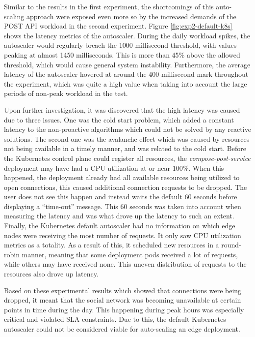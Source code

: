 Similar to the results in the first experiment, the shortcomings of this auto-scaling approach were exposed even more so by the increased demands of the POST API workload in the second experiment. Figure \ref{fig:exp2-default-k8s} shows the latency metrics of the autoscaler. During the daily workload spikes, the autoscaler would regularly breach the 1000 millisecond threshold, with values peaking at almost 1450 milliseconds. This is more than 45\% above the allowed threshold, which would cause general system instability. Furthermore, the average latency of the autoscaler hovered at around the 400-millisecond mark throughout the experiment, which was quite a high value when taking into account the large periods of non-peak workload in the test.\par

Upon further investigation, it was discovered that the high latency was caused due to three issues. One was the cold start problem, which added a constant latency to the non-proactive algorithms which could not be solved by any reactive solutions. The second one was the avalanche effect which was caused by resources not being available in a timely manner, and was related to the cold start. Before the Kubernetes control plane could register all resources, the \textit{compose-post-service} deployment may have had a CPU utilization at or near 100\%. When this happened, the deployment already had all available resources being utilized to open connections, this caused additional connection requests to be dropped. The user does not see this happen and instead waits the default 60 seconds before displaying a ``time-out'' message. This 60 seconds was taken into account when measuring the latency and was what drove up the latency to such an extent. Finally, the Kubernetes default autoscaler had no information on which edge nodes were receiving the most number of requests. It only saw CPU utilization metrics as a totality. As a result of this, it scheduled new resources in a round-robin manner, meaning that some deployment pods received a lot of requests, while others may have received none. This uneven distribution of requests to the resources also drove up latency.\par

Based on these experimental results which showed that connections were being dropped, it meant that the social network was becoming unavailable at certain points in time during the day. This happening during peak hours was especially critical and violated SLA constraints. Due to this, the default Kubernetes autoscaler could not be considered viable for auto-scaling an edge deployment.

